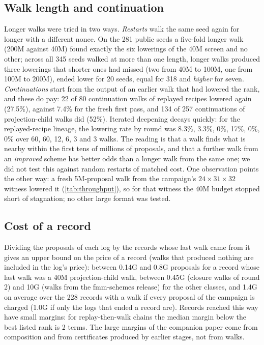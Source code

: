 \subsection{Walk length and continuation}
Longer walks were tried in two ways. \emph{Restarts} walk the same seed again for longer with a different nonce. On the 281 public seeds a five-fold longer walk (200M against 40M) found exactly the six lowerings of the 40M screen and no other; across all 345 seeds walked at more than one length, longer walks produced three lowerings that shorter ones had missed (two from 40M to 100M, one from 100M to 200M), ended lower for 20 seeds, equal for 318 and \emph{higher} for seven.
\emph{Continuations} start from the output of an earlier walk that had lowered the rank, and these do pay: 22 of 80 continuation walks of replayed recipes lowered again (27.5\%), against 7.4\% for the fresh first pass, and 134 of 257 continuations of projection-child walks did (52\%).
Iterated deepening decays quickly: for the replayed-recipe lineage, the lowering rate by round was 8.3\%, 3.3\%, 0\%, 17\%, 0\%, 0\% over 60, 60, 12, 6, 3 and 3 walks.
The reading is that a walk finds what is nearby within the first tens of millions of proposals, and that a further walk from an \emph{improved} scheme has better odds than a longer walk from the same one; we did not test this against random restarts of matched cost.
One observation points the other way: a fresh 5M-proposal walk from the campaign's $24\times31\times32$ witness lowered it (\cref{tab:throughput}), so for that witness the 40M budget stopped short of stagnation; no other large format was tested.

\subsection{Cost of a record}
Dividing the proposals of each log by the records whose last walk came from it gives an upper bound on the price of a record (walks that produced nothing are included in the log's price): between 0.14G and 0.8G proposals for a record whose last walk was a 40M projection-child walk, between 0.45G (closure walks of round 2) and 10G (walks from the fmm-schemes release) for the other classes, and 1.4G on average over the 228 records with a walk if every proposal of the campaign is charged (1.0G if only the logs that ended a record are).
Records reached this way have small margins: for replay-then-walk chains the median margin below the best listed rank is 2 terms.
The large margins of the companion paper come from composition and from certificates produced by earlier stages, not from walks.

